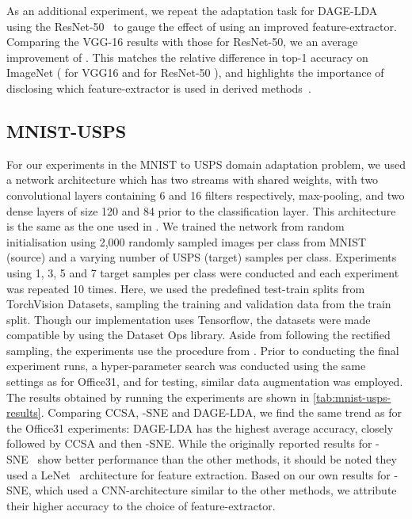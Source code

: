 \documentclass[journal]{IEEEtran}
\begin{document}
As an additional experiment, we repeat the adaptation task for DAGE-LDA using the ResNet-50~\cite{he2016deep} to gauge the effect of using an improved feature-extractor. Comparing the VGG-16 results with those for ResNet-50, we an average improvement of . This matches the relative difference in top-1 accuracy on ImageNet ( for VGG16 and  for ResNet-50 \cite{he2016deep}), and highlights the importance of disclosing which feature-extractor is used in derived methods~\cite{musgrave2020metric}.


\subsection{MNIST-USPS}
For our experiments in the MNIST to USPS domain adaptation problem, we used a network architecture which has two streams with shared weights, with two convolutional layers containing 6 and 16  filters respectively, max-pooling, and two dense layers of size 120 and 84 prior to the classification layer. This architecture is the same as the one used in \cite{motiian2017ccsa}. We trained the network from random initialisation using 2,000 randomly sampled images per class from MNIST (source) and a varying number of USPS (target) samples per class. Experiments using 1, 3, 5 and 7 target samples per class were conducted and each experiment was repeated 10 times.
Here, we used the predefined test-train splits from TorchVision Datasets, sampling the training and validation data from the train split. Though our implementation uses Tensorflow, the datasets were made compatible by using the Dataset Ops library.
Aside from following the rectified sampling, the experiments use the procedure from \cite{fernando2014joint, motiian2017ccsa, xu2019dsne}.
Prior to conducting the final experiment runs, a hyper-parameter search was conducted using the same settings as for Office31, and for testing, similar data augmentation was employed. The results obtained by running the experiments are shown in \cref{tab:mnist-usps-results}. Comparing CCSA, -SNE and DAGE-LDA, we find the same trend as for the Office31 experiments: DAGE-LDA has the highest average accuracy, closely followed by CCSA and then -SNE. While the originally reported results for -SNE~\cite{xu2019dsne} show better performance than the other methods, it should be noted they used a LeNet~\cite{wen2016conv} architecture for feature extraction. Based on our own results for -SNE, which used a CNN-architecture similar to the other methods, we attribute their higher accuracy to the choice of feature-extractor.
\end{document}
